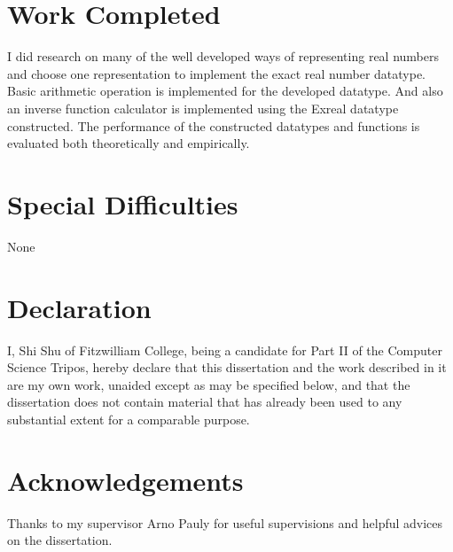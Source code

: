 \documentclass[12pt,twoside,notitlepage]{report}
\begin{document}
\section*{Work Completed}

I did research on many of the well developed ways of representing real numbers and choose one representation to implement the exact real number datatype. Basic arithmetic operation is implemented for the developed datatype. And also an inverse function calculator is implemented using the Exreal datatype constructed. The performance of the constructed datatypes and functions is evaluated both theoretically and empirically.

\section*{Special Difficulties}
None
 
\newpage
\section*{Declaration}

I, Shi Shu of Fitzwilliam College, being a candidate for Part II of the Computer
Science Tripos, hereby declare
that this dissertation and the work described in it are my own work,
unaided except as may be specified below, and that the dissertation
does not contain material that has already been used to any substantial
extent for a comparable purpose.

\bigskip
{}

\medskip
{}

\cleardoublepage

\tableofcontents

\newpage
\section*{Acknowledgements}

Thanks to my supervisor Arno Pauly for useful supervisions and helpful advices on the dissertation. 


\cleardoublepage        %

\setcounter{page}{1}
\pagestyle{headings}
\end{document}
